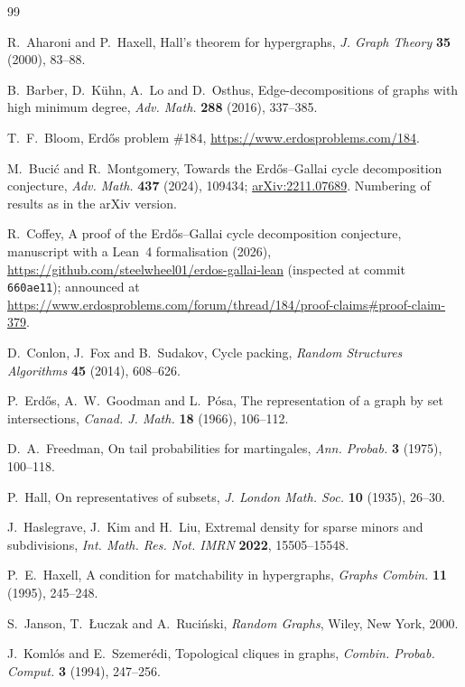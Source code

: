 \documentclass[11pt]{article}
\theoremstyle{definition}
\theoremstyle{remark}
\numberwithin{equation}{section}
\numberwithin{figure}{section}
\numberwithin{table}{section}
\begin{document}
\begin{thebibliography}{99}\small

 R.~Aharoni and P.~Haxell, Hall's theorem for hypergraphs,
\emph{J. Graph Theory} \textbf{35} (2000), 83--88.

 B.~Barber, D.~K\"uhn, A.~Lo and D.~Osthus, Edge-decompositions
of graphs with high minimum degree, \emph{Adv. Math.} \textbf{288} (2016),
337--385.

 T.~F.~Bloom, Erd\H{o}s problem \#184,
\url{https://www.erdosproblems.com/184}.

 M.~Buci\'c and R.~Montgomery, Towards the Erd\H{o}s--Gallai cycle
decomposition conjecture, \emph{Adv. Math.} \textbf{437} (2024), 109434;
\href{https://arxiv.org/abs/2211.07689}{arXiv:2211.07689}. Numbering of results
as in the arXiv version.

 R.~Coffey, A proof of the Erd\H{o}s--Gallai cycle decomposition
conjecture, manuscript with a Lean~4 formalisation (2026),
\url{https://github.com/steelwheel01/erdos-gallai-lean} (inspected at commit
\texttt{660ae11}); announced at
\url{https://www.erdosproblems.com/forum/thread/184/proof-claims\#proof-claim-379}.

 D.~Conlon, J.~Fox and B.~Sudakov, Cycle packing,
\emph{Random Structures Algorithms} \textbf{45} (2014), 608--626.

 P.~Erd\H{o}s, A.~W.~Goodman and L.~P\'osa, The representation of
a graph by set intersections, \emph{Canad. J. Math.} \textbf{18} (1966),
106--112.

 D.~A.~Freedman, On tail probabilities for martingales,
\emph{Ann. Probab.} \textbf{3} (1975), 100--118.

 P.~Hall, On representatives of subsets, \emph{J. London Math.
Soc.} \textbf{10} (1935), 26--30.

 J.~Haslegrave, J.~Kim and H.~Liu, Extremal density for sparse
minors and subdivisions, \emph{Int. Math. Res. Not. IMRN} \textbf{2022},
15505--15548.

 P.~E.~Haxell, A condition for matchability in hypergraphs,
\emph{Graphs Combin.} \textbf{11} (1995), 245--248.

 S.~Janson, T.~{\L}uczak and A.~Ruci\'nski, \emph{Random Graphs},
Wiley, New York, 2000.

 J.~Koml\'os and E.~Szemer\'edi, Topological cliques in graphs,
\emph{Combin. Probab. Comput.} \textbf{3} (1994), 247--256.


\end{thebibliography}
\end{document}
